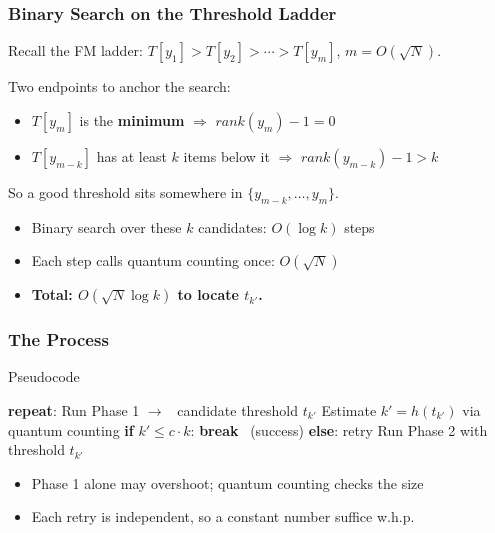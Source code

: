 \documentclass[xcolor=table]{beamer}
\theoremstyle{remark}
\theoremstyle{plain}
\def\\{ }%
\begin{document}
\begin{frame}
  \frametitle{Binary Search on the Threshold Ladder}
  Recall the FM ladder: $T[y_1] > T[y_2] > \cdots > T[y_m]$, $m = O(\sqrt{N})$.

  \vspace{0.5cm}
  Two endpoints to anchor the search:
  \begin{itemize}
    \item $T[y_m]$ is the \textbf{minimum} \quad $\Rightarrow$ \quad $rank(y_m)-1 = 0$
    \item $T[y_{m-k}]$ has at least $k$ items below it \quad $\Rightarrow$ \quad $rank(y_{m-k})-1 > k$
  \end{itemize}

  \vspace{0.5cm}
  So a good threshold sits somewhere in $\{y_{m-k}, \dots, y_{m}\}$.

  \vspace{0.5cm}
  \begin{itemize}
    \item Binary search over these $k$ candidates: $O(\log k)$ steps
    \item Each step calls quantum counting once: $O(\sqrt{N})$
    \item \textbf{Total: $O(\sqrt{N}\log k)$ to locate $t_{k'}$.}
  \end{itemize}
\end{frame}

\begin{frame}
  \frametitle{The Process}
  \begin{block}{Pseudocode}
  \begin{flushleft}
  \ttfamily
  \textbf{repeat}: \\
  \quad Run Phase 1 \quad $\rightarrow$ \ candidate threshold $t_{k'}$ \\
  \quad Estimate $k' = h(t_{k'})$ via quantum counting \\
  \quad \textbf{if} $k' \le c \cdot k$: \quad \textbf{break} \ (success) \\
  \quad \textbf{else}: \quad retry \\
  Run Phase 2 with threshold $t_{k'}$
  \end{flushleft}
  \end{block}

  \vspace{0.4cm}
  \begin{itemize}
    \item Phase 1 alone may overshoot; quantum counting checks the size
    \item Each retry is independent, so a constant number suffice w.h.p.
  \end{itemize}
\end{frame}
\end{document}
